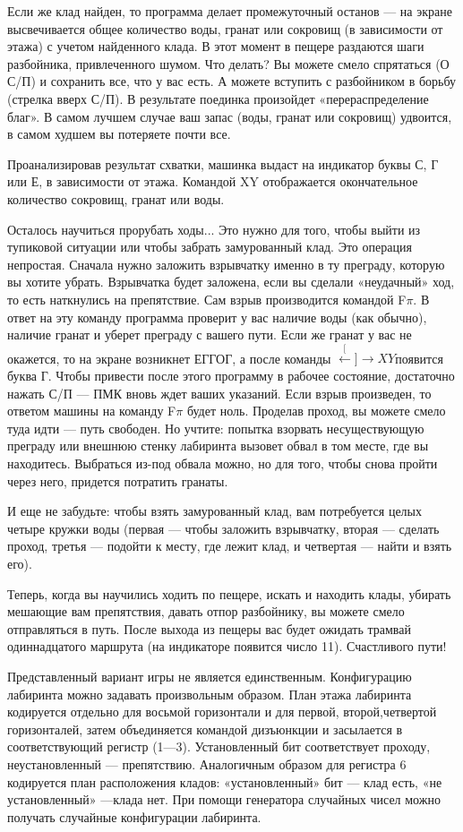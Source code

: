 \documentclass[11pt,a4paper,oneside]{article}
\def\XY{$\stackrel[\leftarrow]{\rightarrow}{XY}$}
\begin{document}
Если же клад найден, то программа делает промежуточный останов — на экране высвечивается общее количество воды, гранат или сокровищ (в зависимости от этажа) с учетом найденного клада. В этот момент в пещере раздаются шаги разбойника, привлеченного шумом. Что делать? Вы можете смело спрятаться (О С/П) и сохранить все, что у вас есть. А можете вступить с разбойником в борьбу (стрелка вверх С/П). В результате поединка произойдет «перераспределение благ». В самом лучшем случае ваш запас (воды, гранат или сокровищ) удвоится, в самом худшем вы потеряете почти все.

Проанализировав результат схватки, машинка выдаст на индикатор буквы С, Г или Е, в зависимости от этажа. Командой XY отображается окончательное количество сокровищ, гранат или воды.

Осталось научиться прорубать ходы... Это нужно для того, чтобы выйти из тупиковой ситуации или чтобы забрать замурованный клад. Это операция непростая. Сначала нужно заложить взрывчатку именно в ту преграду, которую вы хотите убрать. Взрывчатка будет заложена, если вы сделали «неудачный» ход, то есть наткнулись на препятствие. Сам взрыв производится командой F$\pi$. В ответ на эту команду программа проверит у вас наличие воды (как обычно), наличие гранат и уберет преграду с вашего пути. Если же гранат у вас не окажется, то на экране возникнет ЕГГОГ, а после команды \XY появится буква Г. Чтобы привести после этого программу в рабочее состояние, достаточно нажать С/П — ПМК вновь ждет ваших указаний. Если взрыв произведен, то ответом машины на команду F$\pi$ будет ноль. Проделав проход, вы можете смело туда идти — путь свободен. Но учтите: попытка взорвать несуществующую преграду или внешнюю стенку лабиринта вызовет обвал в том месте, где вы находитесь. Выбраться из-под обвала можно, но для того, чтобы снова пройти через него, придется потратить гранаты.

И еще не забудьте: чтобы взять замурованный клад, вам потребуется целых четыре кружки воды (первая — чтобы заложить взрывчатку, вторая — сделать проход, третья — подойти к месту, где лежит клад, и четвертая — найти и взять его).

Теперь, когда вы научились ходить по пещере, искать и находить клады, убирать мешающие вам препятствия, давать отпор разбойнику, вы можете смело отправляться в путь. После выхода из пещеры вас будет ожидать трамвай одиннадцатого маршрута (на индикаторе появится число 11). Счастливого пути!

Представленный вариант игры не является единственным. Конфигурацию лабиринта можно задавать произвольным образом. План этажа лабиринта кодируется отдельно для восьмой горизонтали и для первой, второй,четвертой горизонталей, затем объединяется командой дизъюнкции и засылается в соответствующий регистр (1—3). Установленный бит соответствует проходу, неустановленный — препятствию. Аналогичным образом для регистра 6 кодируется план расположения кладов: «установленный» бит — клад есть, «не установленный» —клада нет. При помощи генератора случайных чисел можно получать случайные конфигурации лабиринта.
\end{document}
